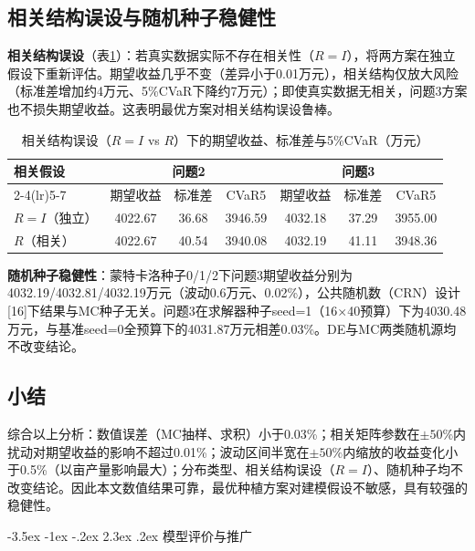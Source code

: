 \documentclass[12pt,a4paper]{article}
\makeatletter
\renewcommand\section{\@startsection{section}{1}{\z@}%
  {-3.5ex \@plus -1ex \@minus -.2ex}%
  {2.3ex \@plus .2ex}%
  {\centering\normalfont\Large\bfseries}}
\makeatother
\begin{document}
\subsection{相关结构误设与随机种子稳健性}

\textbf{相关结构误设}（表\ref{tab:rob_indep}）：若真实数据实际不存在相关性（$R=I$），将两方案在独立假设下重新评估。期望收益几乎不变（差异小于0.01万元），相关结构仅放大风险（标准差增加约4万元、5\%CVaR下降约7万元）；即使真实数据无相关，问题3方案也不损失期望收益。这表明最优方案对相关结构误设鲁棒。

\begin{table}[H]
\centering
\caption{相关结构误设（$R=I$ vs $R$）下的期望收益、标准差与5\%CVaR（万元）}
\label{tab:rob_indep}
\begin{tabular}{lcccccc}
\toprule
相关假设 & \multicolumn{3}{c}{问题2} & \multicolumn{3}{c}{问题3}\\
\cmidrule(lr){2-4}\cmidrule(lr){5-7}
 & 期望收益 & 标准差 & CVaR5 & 期望收益 & 标准差 & CVaR5\\
\midrule
$R=I$（独立） & 4022.67 & 36.68 & 3946.59 & 4032.18 & 37.29 & 3955.00\\
$R$（相关） & 4022.67 & 40.54 & 3940.08 & 4032.19 & 41.11 & 3948.36\\
\bottomrule
\end{tabular}
\end{table}

\textbf{随机种子稳健性}：蒙特卡洛种子0/1/2下问题3期望收益分别为4032.19/4032.81/4032.19万元（波动0.6万元、0.02\%），公共随机数（CRN）设计[16]下结果与MC种子无关。问题3在求解器种子seed=1（16$\times$40预算）下为4030.48万元，与基准seed=0全预算下的4031.87万元相差0.03\%。DE与MC两类随机源均不改变结论。

\subsection{小结}

综合以上分析：数值误差（MC抽样、求积）小于0.03\%；相关矩阵参数在$\pm50\%$内扰动对期望收益的影响不超过0.01\%；波动区间半宽在$\pm50\%$内缩放的收益变化小于0.5\%（以亩产量影响最大）；分布类型、相关结构误设（$R=I$）、随机种子均不改变结论。因此本文数值结果可靠，最优种植方案对建模假设不敏感，具有较强的稳健性。

\section{模型评价与推广}
\end{document}
